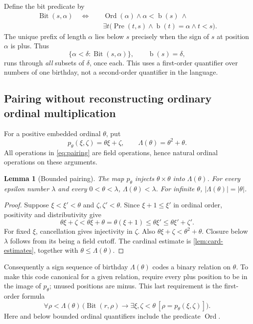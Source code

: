 \documentclass[11pt,letterpaper]{article}
\newtheorem{lemma}[theorem]{Lemma}
\theoremstyle{definition}
\theoremstyle{remark}
\newcommand{\Ord}{\operatorname{Ord}}
\newcommand{\bd}{\operatorname{b}}
\newcommand{\Bit}{\operatorname{Bit}}
\newcommand{\Pre}{\operatorname{Pre}}
\newcommand{\card}[1]{\lvert#1\rvert}
\begin{document}
Define the bit predicate by
\begin{align}
 \Bit(s,\alpha)\quad\Longleftrightarrow\quad &
 \Ord(\alpha)\land\alpha<\bd(s)\ \land\nonumber\\
 &\exists t\bigl(\Pre(t,s)\land\bd(t)=\alpha\land t<s\bigr).
 \label{eq:bit}
\end{align}
The unique prefix of length $\alpha$ lies below $s$ precisely when the sign
of $s$ at position $\alpha$ is plus. Thus
\begin{equation}
 \{\alpha<\delta:\Bit(s,\alpha)\},\qquad\bd(s)=\delta,
 \label{eq:fiber-subsets}
\end{equation}
runs through \emph{all} subsets of $\delta$, once each. This uses a
first-order quantifier over numbers of one birthday, not a second-order
quantifier in the language.

\subsection{Pairing without reconstructing ordinary ordinal multiplication}

For a positive embedded ordinal $\theta$, put
\begin{equation}
 p_\theta(\xi,\zeta)=\theta\xi+\zeta,
 \qquad \Lambda(\theta)=\theta^2+\theta.
 \label{eq:pairing}
\end{equation}
All operations in \eqref{eq:pairing} are field operations, hence natural
ordinal operations on these arguments.

\begin{lemma}[Bounded pairing]
\label{lem:pairing}
The map $p_\theta$ injects $\theta\times\theta$ into $\Lambda(\theta)$.
For every epsilon number $\lambda$ and every $0<\theta<\lambda$,
$\Lambda(\theta)<\lambda$. For infinite $\theta$,
$\card{\Lambda(\theta)}=\card\theta$.
\end{lemma}
\begin{proof}
Suppose $\xi<\xi'<\theta$ and $\zeta,\zeta'<\theta$. Since
$\xi+1\le\xi'$ in ordinal order, positivity and distributivity give
\[
 \theta\xi+\zeta<\theta\xi+\theta
 =\theta(\xi+1)\le\theta\xi'\le\theta\xi'+\zeta'.
\]
For fixed $\xi$, cancellation gives injectivity in $\zeta$. Also
$\theta\xi+\zeta<\theta^2+\theta$. Closure below $\lambda$ follows from its
being a field cutoff. The cardinal estimate is
\cref{lem:card-estimates}, together with $\theta\le\Lambda(\theta)$.
\end{proof}

Consequently a sign sequence of birthday $\Lambda(\theta)$ codes a binary
relation on $\theta$. To make this code canonical for a given relation,
require every plus position to be in the image of $p_\theta$; unused
positions are minus. This last requirement is the first-order formula
\[
 \forall\rho<\Lambda(\theta)\,
 \bigl(\Bit(r,\rho)\longrightarrow
       \exists\xi,\zeta<\theta\ [\rho=p_\theta(\xi,\zeta)]\bigr).
\]
Here and below bounded ordinal quantifiers include the predicate $\Ord$.
\end{document}

